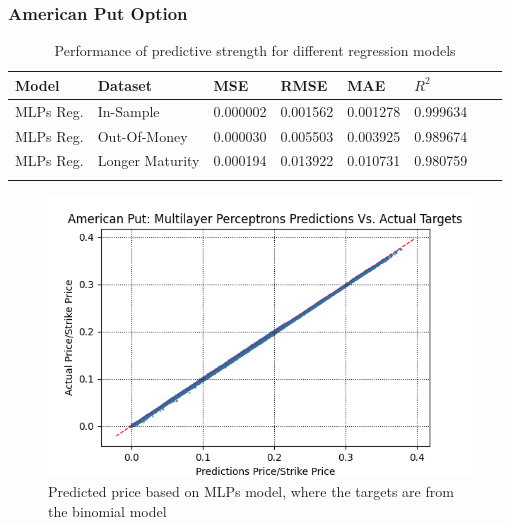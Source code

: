 



\subsubsection{American Put Option}

\begin{table}[th]
\caption{Performance of predictive strength for different regression models}
\label{tab:euroPerformanceComparision}
\centering
\begin{tabular}{l l l l l l l l }
\toprule
\textbf{Model} & \textbf{Dataset} & \textbf{MSE} & \textbf{RMSE} & \textbf{MAE} & \textbf{$R^2$} \\
\midrule
MLPs Reg. & In-Sample & 0.000002 & 0.001562 & 0.001278 & 0.999634\\
MLPs Reg. & Out-Of-Money & 0.000030 & 0.005503 & 0.003925 & 0.989674\\
MLPs Reg. & Longer Maturity & 0.000194 & 0.013922 & 0.010731 & 0.980759\\
\bottomrule\\
\end{tabular}
\end{table}

\begin{figure}[th]
\centering
\includegraphics{Figures/PredictionAmerP.png}
\decoRule
\caption[MLPs Predictions Vs. Actual Prices For American Put]{Predicted price based on MLPs model, where the targets are from the binomial model}
\label{fig:PredictionAmerP}
\end{figure}

